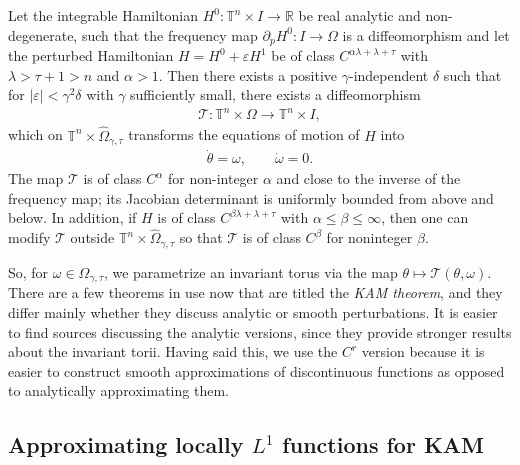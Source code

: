 \begin{theorem}\label{thm:KAM}
Let the integrable Hamiltonian $H^0:\mathbb T^n\times I\to\mathbb R$ be real analytic and non-degenerate, such that the frequency map $\partial_p H^0:I\to\Omega$ is a diffeomorphism and let the perturbed Hamiltonian $H=H^0+\varepsilon H^1$ be of class $C^{\alpha\lambda+\lambda+\tau}$ with $\lambda>\tau+1>n$ and $\alpha>1$. Then there exists a positive $\gamma$-independent $\delta$ such that for $|\varepsilon|<\gamma^2\delta$ with $\gamma$ sufficiently small, there exists a diffeomorphism
\begin{align*}
\mathcal T: \mathbb T^n\times\Omega \to\mathbb T^n\times I,
\end{align*} 
which on $\mathbb T^n\times\hat\Omega_{\gamma,\tau}$ transforms the equations of motion of $H$ into
\begin{align*}
\dot \theta=\omega,\qquad \dot\omega=0.
\end{align*}
The map $\mathcal T$ is of class $C^\alpha$ for non-integer $\alpha$ and close to the inverse of the frequency map; its Jacobian determinant is uniformly bounded from above and below. In addition, if $H$ is of class $C^{\beta\lambda+\lambda+\tau}$ with $\alpha\le\beta\le\infty$, then one can modify $\mathcal T$ outside $\mathbb T^n\times\hat\Omega_{\gamma,\tau}$ so that $\mathcal T$ is of class $C^\beta$ for noninteger $\beta$.
\end{theorem}

So, for $\omega\in\hat\Omega_{\gamma,\tau}$, we parametrize an invariant torus via the map $\theta\mapsto\mathcal T(\theta,\omega)$. There are a few theorems in use now that are titled the \textit{KAM theorem}, and they differ mainly whether they discuss analytic or smooth perturbations. It is easier to find sources discussing the analytic versions, since they provide stronger results about the invariant torii. Having said this, we use the $C^r$ version because it is easier to construct smooth approximations of discontinuous functions as opposed to analytically approximating them.

\subsection{Approximating locally $L^1$ functions for KAM}

